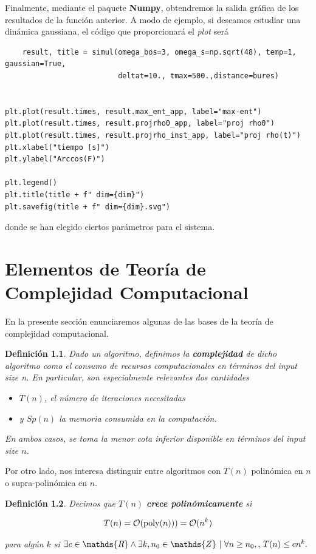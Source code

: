 \documentclass{report} %
\newtheorem{definition}{Definición}[section]
\numberwithin{equation}{section}
\begin{document}
Finalmente, mediante el paquete \textbf{Numpy}, obtendremos la salida gráfica de los resultados de la función anterior. A modo de ejemplo, si deseamos estudiar una dinámica gaussiana, el código que proporcionará el \textit{plot} será 

\begin{verbatim}
    result, title = simul(omega_bos=3, omega_s=np.sqrt(48), temp=1, gaussian=True,
                          deltat=10., tmax=500.,distance=bures)


plt.plot(result.times, result.max_ent_app, label="max-ent")
plt.plot(result.times, result.projrho0_app, label="proj rho0")
plt.plot(result.times, result.projrho_inst_app, label="proj rho(t)")
plt.xlabel("tiempo [s]")
plt.ylabel("Arccos(F)")

plt.legend()
plt.title(title + f" dim={dim}")
plt.savefig(title + f" dim={dim}.svg")
\end{verbatim}

donde se han elegido ciertos parámetros para el sistema. 

\chapter{Elementos de Teor\'ia de Complejidad Computacional}
\label{Appendix D}

En la presente sección enunciaremos algunas de las bases de la teoría de complejidad computacional.

\begin{definition}
Dado un algoritmo, definimos la \textbf{complejidad} de dicho algoritmo como el consumo de recursos computacionales en términos del \textit{input size n}. En particular, son especialmente relevantes dos cantidades

\begin{itemize}
    \item $T(n)$, el número de iteraciones necesitadas 
    \item y $Sp(n)$ la memoria consumida en la computación.
\end{itemize}

En ambos casos, se toma la menor cota inferior disponible en términos del input size $n$.
\end{definition}

Por otro lado, nos interesa distinguir entre algoritmos con $T(n)$ polinómica en $n$ o supra-polinómica en $n$.

\begin{definition}
Decimos que $T(n)$ \textbf{crece polinómicamente} si 

$$
T(n) = \mathcal{O}(\textnormal{poly}(n))) = \mathcal{O}(n^k)
$$

para algún $k$ si $\exists c \in \mathds{R} \land \exists k, n_0 \in \mathds{Z} \textnormal{ | } \forall n \geq n_0, \textnormal{, } T(n) \leq cn^{k}.$
\end{definition}
\end{document}
